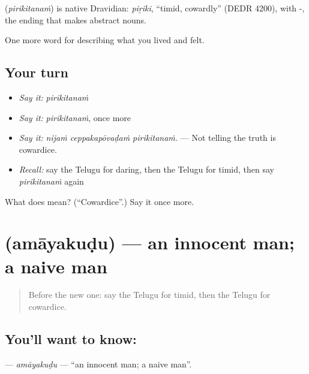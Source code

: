 \begin{cousinweb}
\textbf{} (\emph{pirikitanaṁ}) is native Dravidian: \emph{piṟiki}, \textquotedblleft{}timid, cowardly\textquotedblright{} (DEDR 4200), with -, the ending that makes abstract nouns.
\end{cousinweb}

\begin{grammarlens}[title={What you've built}]
One more word for describing what you lived and felt.
\end{grammarlens}

\subsection*{Your turn}
\begin{itemize}
\raggedright
  \item \emph{Say it:} \emph{pirikitanaṁ}
  \item \emph{Say it:} \emph{pirikitanaṁ}, once more
  \item \emph{Say it:} \emph{nijaṁ ceppakapōvaḍaṁ pirikitanaṁ.} — Not telling the truth is cowardice.
  \item \emph{Recall:} say the Telugu for daring, then the Telugu for timid, then say \emph{pirikitanaṁ} again
\end{itemize}

\begin{tcolorbox}[breakable,colback=teal!4,colframe=teal!35!black,title={Before you move on}]
What does  mean? (\textquotedblleft{}Cowardice\textquotedblright{}.) Say it once more.
\end{tcolorbox}
\section[\texorpdfstring{\te{అమాయకుడు} (amāyakuḍu)}{అమాయకుడు (amāyakuḍu)}]{ (amāyakuḍu) — an innocent man; a naive man}

\label{lesson:TE-C509-amayakudu}



\begin{quote}
Before the new one: say the Telugu for timid, then the Telugu for cowardice.
\end{quote}

\subsection*{You'll want to know: }
\textbf{} — \emph{amāyakuḍu} — \textquotedblleft{}an innocent man; a naive man\textquotedblright{}.

